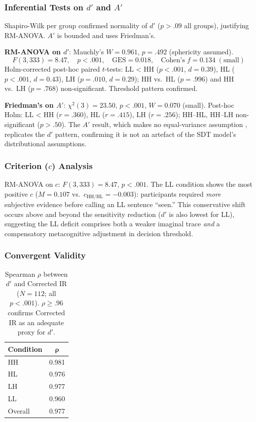 \documentclass[12pt, a4paper]{article}
\begin{document}
\subsubsection{Inferential Tests on $d'$ and $A'$}

Shapiro-Wilk per group confirmed normality of $d'$ ($p > .09$ all groups),
justifying RM-ANOVA. $A'$ is bounded and uses Friedman's.

\textbf{RM-ANOVA on $d'$}: Mauchly's $W = 0.961$, $p = .492$ (sphericity
assumed).
\[
  F(3, 333) = 8.47,\quad p < .001,\quad
  \text{GES} = 0.018,\quad \text{Cohen's } f = 0.134 \;(\text{small})
\]
Holm-corrected post-hoc paired $t$-tests: LL < HH ($p < .001$, $d = 0.39$),
HL ($p < .001$, $d = 0.43$), LH ($p = .010$, $d = 0.29$); HH vs.\ HL
($p = .996$) and HH vs.\ LH ($p = .768$) non-significant. Threshold
pattern confirmed.

\textbf{Friedman's on $A'$}: $\chi^2(3) = 23.50$, $p < .001$,
$W = 0.070$ (small). Post-hoc Holm: LL < HH ($r = .360$), HL ($r = .415$),
LH ($r = .256$); HH--HL, HH--LH non-significant ($p > .50$).
The $A'$ result, which makes no equal-variance assumption
\citep{snodgrass1988}, replicates the $d'$ pattern, confirming it is
not an artefact of the SDT model's distributional assumptions.

\subsubsection{Criterion ($c$) Analysis}

RM-ANOVA on $c$: $F(3, 333) = 8.47$, $p < .001$. The LL condition
shows the most positive $c$ ($M = 0.107$ vs.\
$c_{\text{HH/HL}} = -0.003$): participants required \emph{more}
subjective evidence before calling an LL sentence ``seen.''
This conservative shift occurs above and beyond the sensitivity
reduction ($d'$ is also lowest for LL), suggesting the LL deficit
comprises both a weaker imaginal trace \emph{and} a compensatory
metacognitive adjustment in decision threshold.

\subsubsection{Convergent Validity}

\begin{table}[htbp]
  \centering\small
  \begin{tabular}{lc}
    \toprule
    \textbf{Condition} & $\boldsymbol{\rho}$ \\
    \midrule
    HH & 0.981 \\ HL & 0.976 \\ LH & 0.977 \\ LL & 0.960 \\
    Overall & 0.977 \\
    \bottomrule
  \end{tabular}
  \caption{Spearman $\rho$ between $d'$ and Corrected IR ($N = 112$;
  all $p < .001$). $\rho \geq .96$ confirms Corrected IR as an adequate
  proxy for $d'$.}
  \label{tab:convergent}
\end{table}
\end{document}
